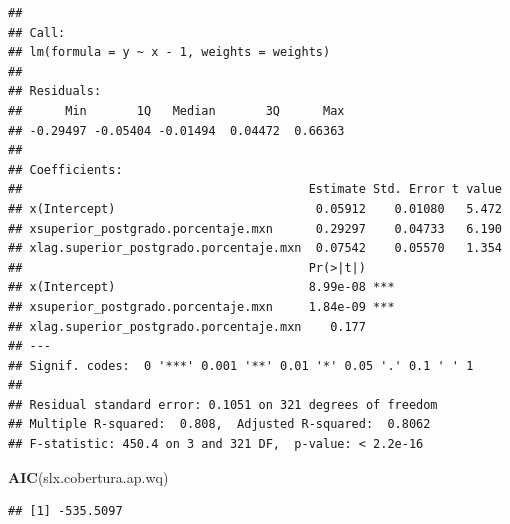 \documentclass[12pt,]{book}
\newenvironment{Shaded}{\begin{snugshade}}{\end{snugshade}}
\newcommand{\KeywordTok}[1]{\textcolor[rgb]{0.13,0.29,0.53}{\textbf{#1}}}
\newcommand{\NormalTok}[1]{#1}
\begin{document}
\begin{verbatim}
## 
## Call:
## lm(formula = y ~ x - 1, weights = weights)
## 
## Residuals:
##      Min       1Q   Median       3Q      Max 
## -0.29497 -0.05404 -0.01494  0.04472  0.66363 
## 
## Coefficients:
##                                        Estimate Std. Error t value
## x(Intercept)                            0.05912    0.01080   5.472
## xsuperior_postgrado.porcentaje.mxn      0.29297    0.04733   6.190
## xlag.superior_postgrado.porcentaje.mxn  0.07542    0.05570   1.354
##                                        Pr(>|t|)    
## x(Intercept)                           8.99e-08 ***
## xsuperior_postgrado.porcentaje.mxn     1.84e-09 ***
## xlag.superior_postgrado.porcentaje.mxn    0.177    
## ---
## Signif. codes:  0 '***' 0.001 '**' 0.01 '*' 0.05 '.' 0.1 ' ' 1
## 
## Residual standard error: 0.1051 on 321 degrees of freedom
## Multiple R-squared:  0.808,  Adjusted R-squared:  0.8062 
## F-statistic: 450.4 on 3 and 321 DF,  p-value: < 2.2e-16
\end{verbatim}

\begin{Shaded}
\begin{Highlighting}[]
\KeywordTok{AIC}\NormalTok{(slx.cobertura.ap.wq)}
\end{Highlighting}
\end{Shaded}

\begin{verbatim}
## [1] -535.5097
\end{verbatim}
\end{document}
